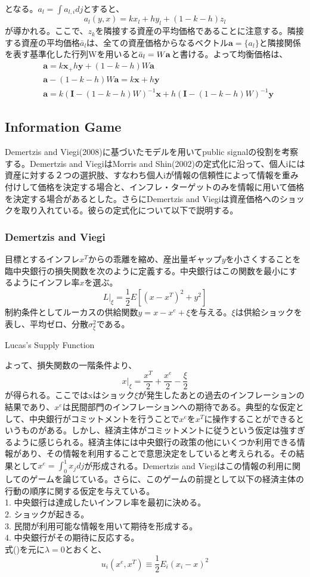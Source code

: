 \documentclass{jsarticle}
\begin{document}
となる。$a_{l} = \int a_{l, i} dj$とすると、
$$ a_{l}(y, x) = kx_{l} + hy_{l} + (1 - k - h)z_{l} $$
が導かれる。ここで、$z_k$を隣接する資産の平均価格であることに注意する。隣接する資産の平均価格$\bar{a}_{l}$は、全ての資産価格からなるベクトル$\bm{a} = \{ a_{l} \}$と隣接関係を表す基準化した行列Wを用いると$\bar{a}_{l}=W\bf{a}$と書ける。よって均衡価格は、
\begin{eqnarray}
 &\bm{a} = k\bm{x}_ + h\bm{y} + (1 - k - h)W\bm{a} \\
 &\bm{a} - (1 - k - h)W\bm{a} = k\bm{x} + h\bm{y} \\
 &\bm{a} = k(\bm{I} - (1 - k - h)W)^{-1}\bm{x} + h(\bm{I} - (1 - k - h)W)^{-1}\bm{y} 
\end{eqnarray}


\subsection{Information Game}
Demertzis and Viegi(2008)に基づいたモデルを用いてpublic signalの役割を考察する。Demertzis and ViegiはMorris and Shin(2002)の定式化に沿って、個人iには資産に対する２つの選択肢、すなわち個人iが情報の信頼性によって情報を重み付けして価格を決定する場合と、インフレ・ターゲットのみを情報に用いて価格を決定する場合があるとした。さらにDemertzis and Viegiは資産価格へのショックを取り入れている。彼らの定式化について以下で説明する。
\subsubsection{Demertzis and Viegi}
目標とするインフレ$x^{T}$からの乖離を縮め、産出量ギャップ$y$を小さくすることを臨中央銀行の損失関数を次のように定義する。中央銀行はこの関数を最小にするようにインフレ率$x$を選ぶ。
$$ L|_{\xi} = \frac{1}{2}E[(x - x^{T})^{2} + y^{2}]$$ 
制約条件としてルーカスの供給関数$y = x - x^{e} + \xi$を与える。$\xi$は供給ショックを表し、平均ゼロ、分散$\sigma^{2}_{\xi}$である。
\begin{itembox}[l]{Lucas's Supply Function}
\end{itembox}
よって、損失関数の一階条件より、
$$x|_{\xi} = \frac{x^{T}}{2} + \frac{x^{e}}{2} - \frac{\xi}{2} $$
が得られる。ここではxはショック$\xi$が発生したあとの過去のインフレーションの結果であり、$x^{e}$は民間部門のインフレーションへの期待である。典型的な仮定として、中央銀行がコミットメントを行うことで$x^{e}$を$x^{T}$に操作することができるというものがある。しかし、経済主体がコミットメントに従うという仮定は強すぎるように感じられる。経済主体には中央銀行の政策の他にいくつか利用できる情報があり、その情報を利用することで意思決定をしていると考えられる。その結果として$x^{e} = \int^{1}_{0} x_{j} dj$が形成される。Demertzis and Viegiはこの情報の利用に関してのゲームを論じている。さらに、このゲームの前提として以下の経済主体の行動の順序に関する仮定を与えている。\\
1. 中央銀行は達成したいインフレ率を最初に決める。\\
2. ショックが起きる。\\
3. 民間が利用可能な情報を用いて期待を形成する。\\
4. 中央銀行がその期待に反応する。\\
式()を元に$\lambda=0$とおくと、
$$ u_{i}(x^{e}, x^{T}) \equiv \frac{1}{2} E_{i}(x_{i} - x)^{2} $$ 
\end{document}
